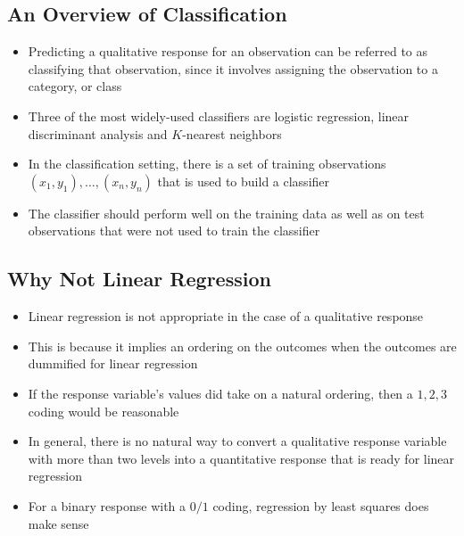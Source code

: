 \documentclass[12pt]{article}
\begin{document}
\subsection{An Overview of Classification}
\begin{itemize} 
\item Predicting a qualitative response for an observation can  be referred to as classifying that observation, since it involves assigning the observation to a category, or class 
\item Three of the most widely-used classifiers are logistic regression, linear discriminant analysis and $K$-nearest neighbors 
\item In the classification setting, there is a set of training observations $(x_1,y_1),\dots,(x_n,y_n)$ that is used to build a classifier
\item The classifier should perform well on the training data as well as on test observations that were not used to train the classifier
\end{itemize}
\subsection{Why Not Linear Regression}
\begin{itemize} 
\item Linear regression is not appropriate in the case of a qualitative response 
\item This is because it implies an ordering on the outcomes when the outcomes are dummified for linear regression 
\item If the response variable's values did take on a natural ordering, then a $1,2,3$ coding would be reasonable 
\item In general, there is no natural way to convert a qualitative response variable with more than two levels into a quantitative response that is ready for linear regression 
\item For a binary response with a $0/1$ coding, regression by least squares does make sense 
\end{itemize}
\end{document}
